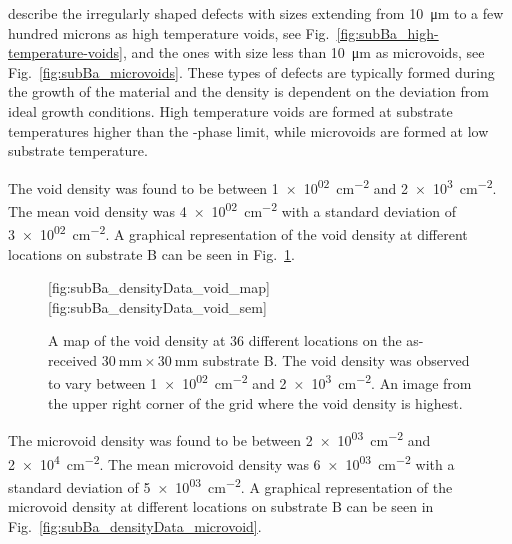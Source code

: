 \citet{selvig2007defects} describe the irregularly shaped defects with sizes extending from \SI{10}{\micro\metre} to a few hundred microns as high temperature voids, see Fig.~\ref{fig:subBa_high-temperature-voids}, and the ones with size less than \SI{10}{\micro\metre} as microvoids, see Fig.~\ref{fig:subBa_microvoids}. These types of defects are typically formed during the growth of the material and the density is dependent on the deviation from ideal growth conditions. High temperature voids are formed at substrate temperatures higher than the -phase limit, while microvoids are formed at low substrate temperature. 

The void density was found to be between \SI{1e+02}{\centi\metre^{-2}} and \SI{2e+3}{\centi\metre^{-2}}. The mean void density was \SI{4e+02}{\centi\metre^{-2}} with a standard deviation of \SI{3e+02}{\centi\metre^{-2}}. A graphical representation of the void density at different locations on substrate B can be seen in Fig.~\ref{fig:subBa_densityData_void}.

\begin{figure}[htbp]
    \centering
        [fig:subBa_densityData_void_map]
        \hfill
        [fig:subBa_densityData_void_sem]
    \caption[Map of the void density on the as-received substrate B.]{ A map of the void density at 36 different locations on the as-received $\SI{30}{\milli\metre}\times\SI{30}{\milli\metre}$ substrate B. The void density was observed to vary between \SI{1e+02}{\centi\metre^{-2}} and \SI{2e+3}{\centi\metre^{-2}}.  An image from the upper right corner of the grid where the void density is highest.}
    \label{fig:subBa_densityData_void}
\end{figure}

The microvoid density was found to be between \SI{2e+03}{\centi\metre^{-2}} and \SI{2e+4}{\centi\metre^{-2}}. The mean microvoid density was \SI{6e+03}{\centi\metre^{-2}} with a standard deviation of \SI{5e+03}{\centi\metre^{-2}}. A graphical representation of the microvoid density at different locations on substrate B can be seen in Fig.~\ref{fig:subBa_densityData_microvoid}.


